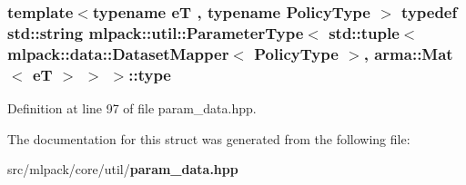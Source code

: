 \subsubsection[{type}]{\setlength{\rightskip}{0pt plus 5cm}template$<$typename eT , typename Policy\+Type $>$ typedef {\bf std\+::string} {\bf mlpack\+::util\+::\+Parameter\+Type}$<$ std\+::tuple$<$ {\bf mlpack\+::data\+::\+Dataset\+Mapper}$<$ Policy\+Type $>$, arma\+::\+Mat$<$ eT $>$ $>$ $>$\+::{\bf type}}\label{structmlpack_1_1util_1_1ParameterType_3_01std_1_1tuple_3_01mlpack_1_1data_1_1DatasetMapper_3_01P0117e227090eb0960979e600219ef0b2_afd0d42ab10a190e4031d6f9177617776}


Definition at line 97 of file param\+\_\+data.\+hpp.



The documentation for this struct was generated from the following file\+:\begin{DoxyCompactItemize}
\item 
src/mlpack/core/util/{\bf param\+\_\+data.\+hpp}\end{DoxyCompactItemize}

